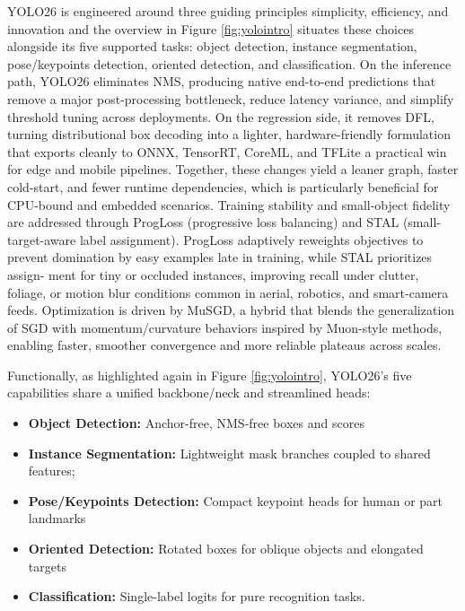 \documentclass{article}
\begin{document}
YOLO26 is engineered around three guiding principles simplicity, efficiency, and innovation and the overview in Figure \ref{fig:yolointro} situates these choices alongside its five supported tasks: object detection, instance segmentation, pose/keypoints detection, oriented detection, and classification. On the inference path, YOLO26 eliminates NMS, producing native end-to-end predictions that remove a major post-processing bottleneck, reduce latency variance, and simplify threshold tuning across deployments. On the regression side, it removes DFL, turning distributional box decoding into a lighter, hardware-friendly formulation that exports cleanly to ONNX, TensorRT, CoreML, and TFLite a practical win for edge and mobile pipelines. Together, these changes yield a leaner graph, faster cold-start, and fewer runtime dependencies, which is particularly beneficial for CPU-bound and embedded scenarios. Training stability and small-object fidelity are addressed through ProgLoss (progressive loss balancing) and STAL (small-target-aware label assignment). ProgLoss adaptively reweights objectives to prevent domination by easy examples late in training, while STAL prioritizes assign- ment for tiny or occluded instances, improving recall under clutter, foliage, or motion blur conditions common in aerial, robotics, and smart-camera feeds. Optimization is driven by MuSGD, a hybrid that blends the generalization of SGD with momentum/curvature behaviors inspired by Muon-style methods, enabling faster, smoother convergence and more reliable plateaus across scales.



Functionally, as highlighted again in Figure \ref{fig:yolointro}, YOLO26’s five capabilities share a unified backbone/neck and streamlined heads:
\begin{itemize}
    \item \textbf{Object Detection:} Anchor-free, NMS-free boxes and scores
    \item \textbf{Instance Segmentation:} Lightweight mask branches coupled to shared features;
    \item \textbf{Pose/Keypoints Detection:} Compact keypoint heads for human or part landmarks
    \item \textbf{Oriented Detection:} Rotated boxes for oblique objects and elongated targets
    \item \textbf{Classification:} Single-label logits for pure recognition tasks.
\end{itemize}
\end{document}
